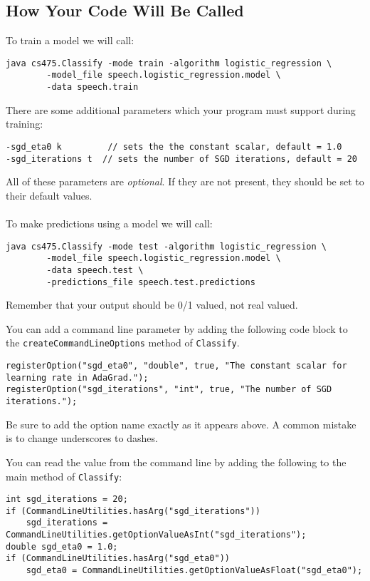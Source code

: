 \documentclass[11pt]{article}
\begin{document}
\subsection{How Your Code Will Be Called}

To train a model we will call:
\begin{verbatim}
java cs475.Classify -mode train -algorithm logistic_regression \
        -model_file speech.logistic_regression.model \
        -data speech.train
\end{verbatim}

There are some additional parameters which your program must support during training:
\begin{verbatim}
-sgd_eta0 k	        // sets the the constant scalar, default = 1.0
-sgd_iterations t  // sets the number of SGD iterations, default = 20
\end{verbatim}

All of these parameters are \emph{optional}. If they are not present, they should be set to their default values.\\
\\
To make predictions using a model we will call:
\begin{verbatim}
java cs475.Classify -mode test -algorithm logistic_regression \
        -model_file speech.logistic_regression.model \
        -data speech.test \
        -predictions_file speech.test.predictions
\end{verbatim}

Remember that your output should be 0/1 valued, not real valued.

You can add a command line parameter by adding the following
code block to the {\tt createCommandLineOptions} method of {\tt Classify}.
\begin{footnotesize}
\begin{verbatim}
registerOption("sgd_eta0", "double", true, "The constant scalar for learning rate in AdaGrad.");
registerOption("sgd_iterations", "int", true, "The number of SGD iterations.");
\end{verbatim}
\end{footnotesize}

Be sure to add the option name exactly as it appears above. A common mistake is to change underscores to dashes.

You can read the value from the command line by adding the following to the main method of {\tt Classify}:
\begin{footnotesize}
\begin{verbatim}
int sgd_iterations = 20;
if (CommandLineUtilities.hasArg("sgd_iterations"))
    sgd_iterations = CommandLineUtilities.getOptionValueAsInt("sgd_iterations");
double sgd_eta0 = 1.0;
if (CommandLineUtilities.hasArg("sgd_eta0"))
    sgd_eta0 = CommandLineUtilities.getOptionValueAsFloat("sgd_eta0");
\end{verbatim}

\end{footnotesize}
\end{document}
